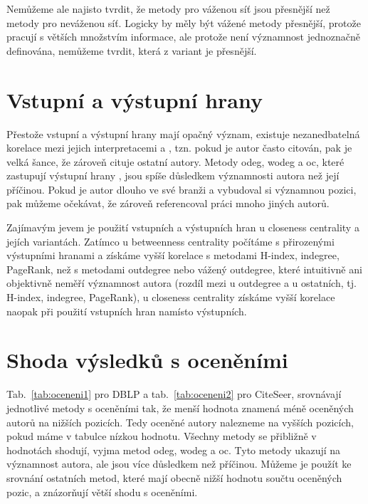 \documentclass{bakalarka}
\begin{document}
Nemůžeme ale najisto tvrdit, že metody pro váženou síť jsou přesnější než
metody pro neváženou síť. Logicky by měly být vážené metody přesnější, protože
pracují s větších množstvím informace, ale protože není významnost jednoznačně
definována, nemůžeme tvrdit, která z variant je přesnější.

\section{Vstupní a výstupní hrany}


Přestože vstupní a výstupní hrany mají opačný význam, existuje nezanedbatelná
korelace mezi jejich interpretacemi  a , tzn. pokud
je autor často citován, pak je velká šance, že zároveň cituje ostatní autory.
Metody odeg, wodeg a oc, které zastupují výstupní hrany , jsou spíše
důsledkem významnosti autora než její příčinou. Pokud je autor dlouho ve své
branži a vybudoval si významnou pozici, pak můžeme očekávat, že zároveň
referencoval práci mnoho jiných autorů. 

Zajímavým jevem je použití vstupních a výstupních hran u closeness centrality a
jejích variantách. Zatímco u betweenness centrality počítáme s přirozenými
výstupními hranami a získáme vyšší korelace s metodami H-index, indegree,
PageRank, než s metodami outdegree nebo vážený outdegree, které intuitivně ani
objektivně neměří významnost autora (rozdíl mezi  u outdegree a
 u ostatních, tj. H-index, indegree, PageRank), u closeness
centrality získáme vyšší korelace naopak při použití vstupních hran namísto
výstupních.

\section{Shoda výsledků s oceněními}
Tab.~\ref{tab:oceneni1} pro DBLP a tab.~\ref{tab:oceneni2} pro CiteSeer,
srovnávají jednotlivé metody s oceněními tak, že menší hodnota znamená méně
oceněných autorů na nižších pozicích. Tedy oceněné autory nalezneme na vyšších
pozicích, pokud máme v tabulce nízkou hodnotu. Všechny metody se přibližně v
hodnotách shodují, vyjma metod odeg, wodeg a oc. Tyto metody ukazují na
významnost autora, ale jsou více důsledkem než příčinou. Můžeme je použít ke
srovnání ostatních metod, které mají obecně nižší hodnotu součtu oceněných
pozic, a znázorňují větší shodu s oceněními.
\end{document}
